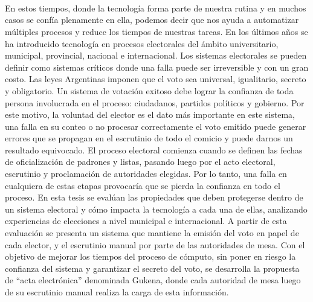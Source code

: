 \ \\
\ \\
\label{pagresum}
\\
\ \\
\ \\

\ \\

\ \\
\ \\

 En estos tiempos, donde la tecnología forma parte de nuestra rutina y en muchos casos se confía plenamente en ella, podemos decir que nos ayuda a automatizar múltiples procesos y reduce los tiempos de nuestras tareas. En los últimos años se ha introducido tecnología en procesos electorales del ámbito universitario, municipal, provincial, nacional e internacional. Los sistemas electorales se pueden definir como sistemas críticos donde una falla puede ser irreversible y con un gran costo. Las leyes Argentinas imponen que el voto sea universal, igualitario, secreto y obligatorio. Un sistema de votación exitoso debe lograr la confianza de toda persona involucrada en el proceso: ciudadanos, partidos políticos y gobierno. Por este motivo, la voluntad del elector es el dato más importante en este sistema, una falla en su conteo o no procesar correctamente el voto emitido puede generar errores que se propagan en el escrutinio de todo el comicio y puede darnos un resultado equivocado.\newline
 El proceso electoral comienza cuando se definen las fechas de oficialización de padrones y listas, pasando luego por el acto electoral, escrutinio y proclamación de autoridades elegidas. Por lo tanto, una falla en cualquiera de estas etapas provocaría que se pierda la confianza en todo el proceso.\newline
 En esta tesis se evalúan las propiedades que deben protegerse dentro de un sistema electoral y cómo impacta la tecnología a cada una de ellas, analizando experiencias de elecciones a nivel municipal e internacional. A partir de esta evaluación se presenta un sistema que mantiene la emisión del voto en papel de cada elector, y el escrutinio manual por parte de las autoridades de mesa. Con el objetivo de mejorar los tiempos del proceso de cómputo, sin poner en riesgo la confianza del sistema y garantizar el secreto del voto, se desarrolla la propuesta de ``acta electrónica'' denominada Gukena, donde cada autoridad de mesa luego de su escrutinio manual realiza la carga de esta información.\newline
